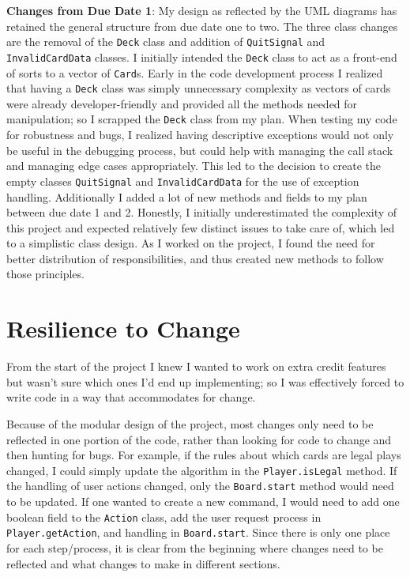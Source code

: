 \documentclass[12pt]{article}
\begin{document}
		{\bf Changes from Due Date 1}: My design as reflected by the UML diagrams has retained the general structure from due date one to two. The three class changes are the removal of the \texttt{Deck} class and addition of \texttt{QuitSignal} and \texttt{InvalidCardData} classes. I initially intended the \texttt{Deck} class to act as a front-end of sorts to a vector of \texttt{Card}s. Early in the code development process I realized that having a \texttt{Deck} class was simply unnecessary complexity as vectors of cards were already developer-friendly and provided all the methods needed for manipulation; so I scrapped the \texttt{Deck} class from my plan. When testing my code for robustness and bugs, I realized having descriptive exceptions would not only be useful in the debugging process, but could help with managing the call stack and managing edge cases appropriately. This led to the decision to create the empty classes \texttt{QuitSignal} and \texttt{InvalidCardData} for the use of exception handling. Additionally I added a lot of new methods and fields to my plan between due date 1 and 2. Honestly, I initially underestimated the complexity of this project and expected relatively few distinct issues to take care of, which led to a simplistic class design. As I worked on the project, I found the need for better distribution of responsibilities, and thus created new methods to follow those principles.
	\section{Resilience to Change}
		From the start of the project I knew I wanted to work on extra credit features but wasn't sure which ones I'd end up implementing; so I was effectively forced to write code in a way that accommodates for change.

		Because of the modular design of the project, most changes only need to be reflected in one portion of the code, rather than looking for code to change and then hunting for bugs. For example, if the rules about which cards are legal plays changed, I could simply update the algorithm in the \texttt{Player.isLegal} method. If the handling of user actions changed, only the \texttt{Board.start} method would need to be updated. If one wanted to create a new command, I would need to add one boolean field to the \texttt{Action} class, add the user request process in \texttt{Player.getAction}, and handling in \texttt{Board.start}. Since there is only one place for each step/process, it is clear from the beginning where changes need to be reflected and what changes to make in different sections.
\end{document}
